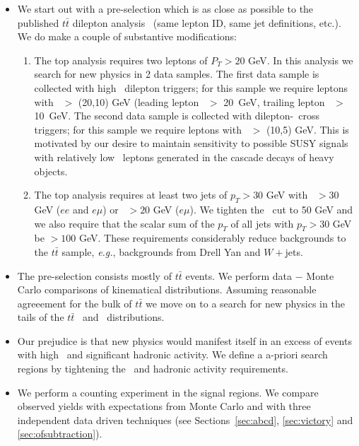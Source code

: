 \begin{itemize}

\item We start out with a pre-selection which is as close as 
possible to the published $t\bar{t}$
dilepton analysis~\cite{ref:top} (same lepton ID, same jet definitions,
etc.).  We do make a couple of substantive modifications:

\begin{enumerate}
\item The top analysis requires two leptons of $P_T > 20$ GeV.  
In this analysis we search for new physics in 2 data samples. The first data
sample is collected with high \pt\ dilepton triggers; for this sample we require
leptons with \pt\ $>$ (20,10) GeV (leading lepton \pt\ $>$ 20~GeV,
trailing lepton \pt\ $>$ 10~GeV. The second data sample is collected
with dilepton-\Ht\ cross triggers; for this sample we require leptons
with \pt\ $>$ (10,5) GeV.  
This is motivated by our desire to maintain sensitivity to possible
SUSY signals with relatively low \pt\ leptons generated in the 
cascade decays of heavy objects.
\item The top analysis requires at least two jets of $p_T > 30$
GeV with \met\ $>30$ GeV ($ee$ and $e\mu$) or \met\ $>20$ GeV ($e\mu$).
We tighten the \met\ cut to 50 GeV and we 
also require that the scalar sum of the $p_T$ of all jets with $p_T > 30$
GeV be $> 100$ GeV.  These requirements considerably
reduce backgrounds to the $t\bar{t}$ sample, {\em e.g.}, backgrounds
from Drell Yan and $W+$jets.
\end{enumerate}

\item The pre-selection consists mostly of $t\bar{t}$ events.  We perform 
data $-$ Monte Carlo comparisons of kinematical distributions.  Assuming
reasonable agreeement for the bulk of $t\bar{t}$ we move on to a 
search for new physics in the tails of the $t\bar{t}$ \met\ and \Ht\ distributions.

\item Our prejudice is that new physics would manifest itself in an
excess of events with high \met\ and significant hadronic activity.
We define a a-priori search regions by tightening the \met\ and 
hadronic activity requirements.

\item We perform a counting experiment in the signal regions.  We compare
observed yields with expectations from Monte Carlo and with three independent
data driven techniques (see Sections~\ref{sec:abcd}, \ref{sec:victory} and \ref{sec:ofsubtraction}).

\end{itemize}



